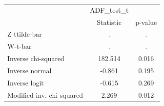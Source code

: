 \begin{tabular}{l*{2}{c}}
\hline\hline
            &  ADF\_test\_t&            \\
            &   Statistic&     p-value\\
\hline
Z-ttilde-bar&           .&           .\\
W-t-bar     &           .&           .\\
Inverse chi-squared&     182.514&       0.016\\
Inverse normal&      -0.861&       0.195\\
Inverse logit&      -0.615&       0.269\\
Modified inv. chi-squared&       2.269&       0.012\\
\hline\hline
\end{tabular}
